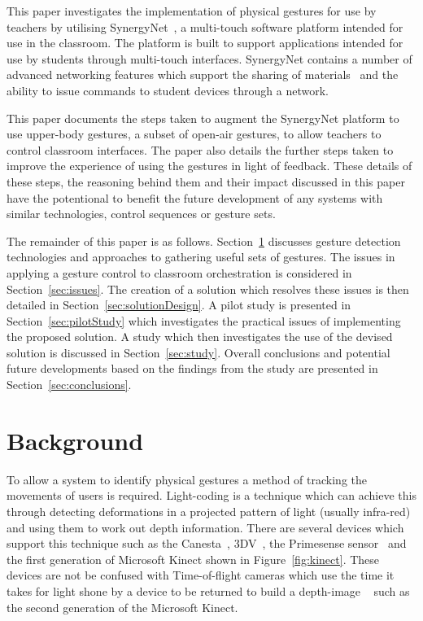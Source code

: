 \documentclass[link]{IWCOMP}
\begin{document}
This paper investigates the implementation of physical gestures for use by teachers by utilising SynergyNet~\cite{HatchA.HigginsSMercier2009}, a multi-touch software platform intended for use in the classroom.
The platform is built to support applications intended for use by students through multi-touch interfaces.
SynergyNet contains a number of advanced networking features which support the sharing of materials~\cite{mcnaughton-et-al:jce2017} and the ability to issue commands to student devices through a network.

This paper documents the steps taken to augment the SynergyNet platform to use upper-body gestures, a subset of open-air gestures, to allow teachers to control classroom interfaces.
The paper also details the further steps taken to improve the experience of using the gestures in light of feedback.
These details of these steps, the reasoning behind them and their impact discussed in this paper have the potentional to benefit the future development of any systems with similar technologies, control sequences or gesture sets.

The remainder of this paper is as follows. 
Section~\ref{sec:background} discusses gesture detection technologies and approaches to gathering useful sets of gestures.
The issues in applying a gesture control to classroom orchestration is considered in Section~\ref{sec:issues}.
The creation of a solution which resolves these issues is then detailed in Section~\ref{sec:solutionDesign}.
A pilot study is presented in Section~\ref{sec:pilotStudy} which investigates the practical issues of implementing the proposed solution.
A study which then investigates the use of the devised solution is discussed in Section~\ref{sec:study}.
Overall conclusions and potential future developments based on the findings from the study are presented in Section~\ref{sec:conclusions}.

\section{Background} 
\label{sec:background}


To allow a system to identify physical gestures a method of tracking the movements of users is required.
Light-coding is a technique which can achieve this through detecting deformations in a projected pattern of light (usually infra-red) and using them to work out depth information.
There are several devices which support this technique such as the Canesta~\cite{Yang2007}, 3DV~\cite{Wilson2007a}, the Primesense sensor~\cite{Wilson2010} and the first generation of Microsoft Kinect shown in Figure~\ref{fig:kinect}.
These devices are not be confused with Time-of-flight cameras which use the time it takes for light shone by a device to be returned to build a depth-image ~\cite{Lange2001} such as the second generation of the Microsoft Kinect.
\end{document}
